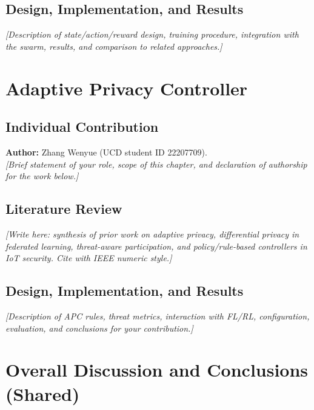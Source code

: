 \documentclass[11pt,a4paper,oneside]{report}
\begin{document}
\section{Design, Implementation, and Results}
\label{sec:rl-work}
\textit{[Description of state/action/reward design, training procedure, integration with the swarm, results, and comparison to related approaches.]}


\chapter{Adaptive Privacy Controller}
\label{ch:apc}

\section{Individual Contribution}
\label{sec:individual-zhang}
\noindent\textbf{Author:} Zhang Wenyue (UCD student ID 22207709).\\
\textit{[Brief statement of your role, scope of this chapter, and declaration of authorship for the work below.]}

\section{Literature Review}
\label{sec:lit-zhang}
\textit{[Write here: synthesis of prior work on adaptive privacy, differential privacy in federated learning, threat-aware participation, and policy/rule-based controllers in IoT security. Cite with IEEE numeric style.]}

\section{Design, Implementation, and Results}
\label{sec:apc-work}
\textit{[Description of APC rules, threat metrics, interaction with FL/RL, configuration, evaluation, and conclusions for your contribution.]}

\chapter{Overall Discussion and Conclusions (Shared)}
\label{ch:overall}
\end{document}
